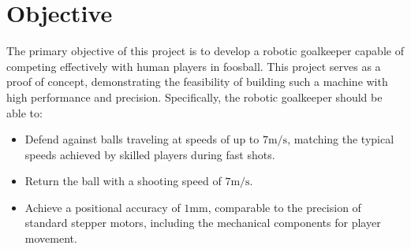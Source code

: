 \section{Objective}\label{sec:objective}

The primary objective of this project is to develop a robotic goalkeeper capable of competing effectively with human players in foosball.
This project serves as a proof of concept, demonstrating the feasibility of building such a machine with high performance and precision.
Specifically, the robotic goalkeeper should be able to:

\begin{itemize}
    \item Defend against balls traveling at speeds of up to $7\text{m/s}$, matching the typical speeds achieved by skilled players during fast shots.
    \item Return the ball with a shooting speed of $7\text{m/s}$.
    \item Achieve a positional accuracy of $1\text{mm}$, comparable to the precision of standard stepper motors, including the mechanical components for player movement.
\end{itemize}
